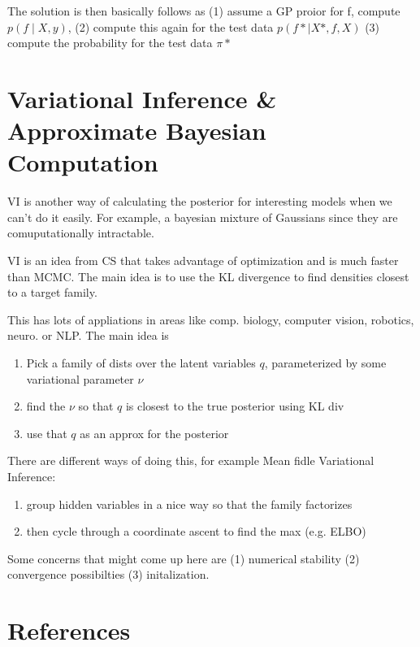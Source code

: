 \documentclass[twoside]{article}
\begin{document}
The solution is then basically follows as (1) assume a GP proior for f,  compute $p(f\mid X,y)$, (2) compute this again for the test data $p(f*\mid X*,f,X)$ (3) compute the probability for the test data $\pi*$

\section{Variational Inference \& Approximate Bayesian Computation}

VI is another way of calculating the posterior for interesting models when we can't do it easily. For example, a bayesian mixture of Gaussians since they are comuputationally intractable.

VI is an idea from CS that takes advantage of optimization and is much faster than MCMC. The main idea is to use the KL divergence to find densities closest to a target family.

This has lots of appliations in areas like comp. biology, computer vision, robotics, neuro. or NLP. The main idea is
\begin{enumerate}
\item Pick a family of dists over the latent variables $q$, parameterized by some variational parameter $\nu$
\item find the $\nu$ so that $q$ is closest to the true posterior using KL div
\item use that $q$ as an approx for the posterior
\end{enumerate}

There are different ways of doing this, for example Mean fidle Variational Inference:
\begin{enumerate}
\item group hidden variables in a nice way so that the family factorizes
\item then cycle through a coordinate ascent to find the max (e.g. ELBO)
\end{enumerate}

Some concerns that might come up here are (1) numerical stability (2) convergence possibilties (3) initalization. 

\section*{References}
\end{document}
